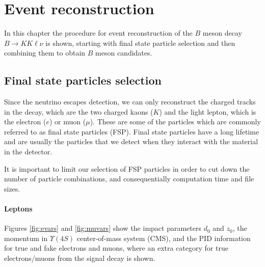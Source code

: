 \chapter{Event reconstruction}

In this chapter the procedure for event reconstruction of the $B$ meson decay $B \to K K \ell \nu$ is shown, starting with final state particle selection and then combining them to obtain $B$ meson candidates.

\section{Final state particles selection}
Since the neutrino escapes detection, we can only reconstruct the charged tracks in the decay, which are the two charged kaons ($K$) and the light lepton, which is the electron ($e$) or muon ($\mu$). These are some of the particles which are commonly referred to as final state particles (FSP). Final state particles have a long lifetime and are usually the particles that we detect when they interact with the material in the detector.

It is important to limit our selection of FSP particles in order to cut down the number of particle combinations, and consequentially computation time and file sizes.

\subsubsection{Leptons}

Figures \ref{fig:evars} and \ref{fig:muvars} show the impact parameters $d_0$ and $z_0$, the momentum in  $\Upsilon(4S)$ center-of-mass system (CMS), and the PID information for true and fake electrons and muons, where an extra category for true electrons/muons from the signal decay is shown.

